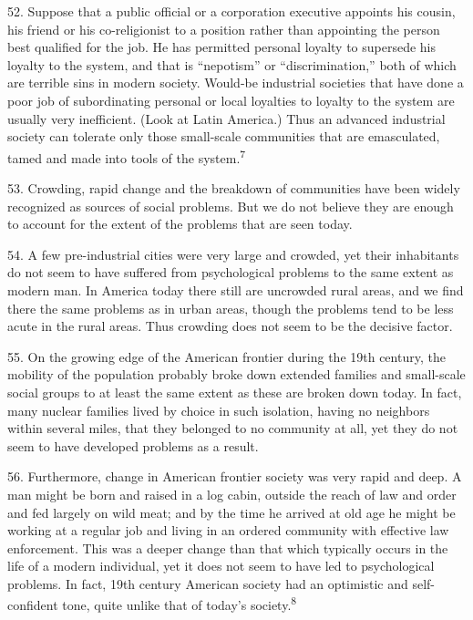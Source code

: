 \documentclass{article}
\begin{document}
52. Suppose that a public official or a corporation executive appoints his cousin, his friend or his 
co-religionist to a position rather than appointing the person best qualified for the job. He has 
permitted personal loyalty to supersede his loyalty to the system, and that is “nepotism” or 
“discrimination,” both of which are terrible sins in modern society. Would-be industrial societies 
that have done a poor job of subordinating personal or local loyalties to loyalty to the system are 
usually very inefficient. (Look at Latin America.) Thus an advanced industrial society can tolerate 
only those small-scale communities that are emasculated, tamed and made into tools of the 
system.\textsuperscript{7} \vspace{\baselineskip}

53. Crowding, rapid change and the breakdown of communities have been widely recognized as 
sources of social problems. But we do not believe they are enough to account for the extent of the 
problems that are seen today. \vspace{\baselineskip} \newpage

54. A few pre-industrial cities were very large and crowded, yet their inhabitants do not seem to 
have suffered from psychological problems to the same extent as modern man. In America today 
there still are uncrowded rural areas, and we find there the same problems as in urban areas, though 
the problems tend to be less acute in the rural areas. Thus crowding does not seem to be the 
decisive factor. \vspace{\baselineskip}

55. On the growing edge of the American frontier during the 19th century, the mobility of the 
population probably broke down extended families and small-scale social groups to at least the 
same extent as these are broken down today. In fact, many nuclear families lived by choice in 
such isolation, having no neighbors within several miles, that they belonged to no community at 
all, yet they do not seem to have developed problems as a result. \vspace{\baselineskip}

56. Furthermore, change in American frontier society was very rapid and deep. A man might be 
born and raised in a log cabin, outside the reach of law and order and fed largely on wild meat; 
and by the time he arrived at old age he might be working at a regular job and living in an ordered 
community with effective law enforcement. This was a deeper change than that which typically 
occurs in the life of a modern individual, yet it does not seem to have led to psychological 
problems. In fact, 19th century American society had an optimistic and self-confident tone, quite 
unlike that of today’s society.\textsuperscript{8} \vspace{\baselineskip}
\end{document}
